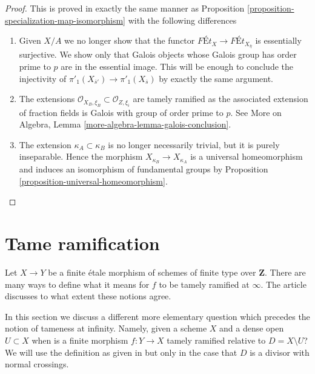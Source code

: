 \begin{proof}
This is proved in exactly the same manner as
Proposition \ref{proposition-specialization-map-isomorphism}
with the following differences
\begin{enumerate}
\item Given $X/A$ we no longer show that the functor
$\textit{F\'Et}_X \to \textit{F\'Et}_{X_{\overline{\eta}}}$
is essentially surjective. We show only that Galois objects
whose Galois group has order prime to $p$ are in the essential
image. This will be enough to conclude the injectivity of
$\pi'_1(X_{\overline{s}'}) \to \pi'_1(X_{\overline{s}})$ by
exactly the same argument.
\item The extensions
$\mathcal{O}_{X_B, \xi_B} \subset \mathcal{O}_{Z, \xi_i}$
are tamely ramified as the associated extension of fraction
fields is Galois with group of order prime to $p$. See
More on Algebra, Lemma \ref{more-algebra-lemma-galois-conclusion}.
\item The extension $\kappa_A \subset \kappa_B$ is no longer
necessarily trivial, but it is purely inseparable.
Hence the morphism $X_{\kappa_B} \to X_{\kappa_A}$
is a universal homeomorphism and induces an isomorphism
of fundamental groups by Proposition \ref{proposition-universal-homeomorphism}.
\end{enumerate}
\end{proof}







\section{Tame ramification}
\label{section-tame}

\noindent
Let $X \to Y$ be a finite \'etale morphism of schemes of finite type
over $\mathbf{Z}$. There are many ways to define what it means for $f$
to be tamely ramified at $\infty$. The article \cite{Kerz-Schmidt}
discusses to what extent these notions agree.

\medskip\noindent
In this section we discuss a different more elementary question which
precedes the notion of tameness at infinity. Namely, given a scheme
$X$ and a dense open $U \subset X$ when is a finite  morphism $f : Y \to X$
tamely ramified relative to $D = X \setminus U$? We will use the definition
as given in \cite{Grothendieck-Murre} but only in the case that $D$ is
a divisor with normal crossings.

























